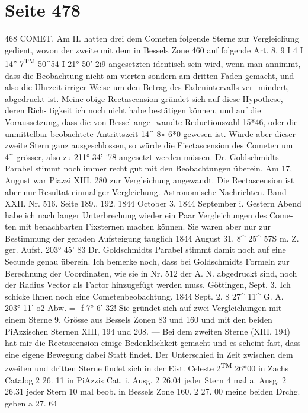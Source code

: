 \documentclass[10pt,a4paper]{article}
\begin{document}
\newpage
\section*{Seite 478}

468  COMET.
Am  II.  hatten   drei  dem  Cometen  folgende  Sterne   zur  Vergleicliung  gedient,  wovon  der   zweite
mit  dem  in  Bessels  Zone  460  auf  folgende  Art.
8.  9     I     4     I     14''  7\textsuperscript{TM}  50\textasciicircum{}54     I     21°  50'  2i\glqq{}9
angesetzten  identisch  sein  wird,  wenn  man  annimmt,  dass  die  Beobachtung  nicht  am  vierten  sondern
am  dritten  Faden  gemacht,  und  also  die  Uhrzeit  irriger  Weise  um  den  Betrag  des  Fadenintervalls  ver-
mindert, abgedruckt  ist.  Meine  obige  Rectascension  gründet  sich  auf  diese  Hypothese,  deren  Rich-
tigkeit ich  noch  nicht  habe  bestätigen  können,  und  auf  die  Voraussetzung,  dass  die  von  Bessel  ange-
wandte Reductionszahl  15*46,  oder  die  unmittelbar  beobachtete  Antrittszeit  14\glqq{}\textasciicircum{}  8\glqq{}»  6*0  gewesen  ist.
Würde  aber  dieser  zweite  Stern  ganz  ausgeschlossen,  so  würde  die  Fiectascension  des  Cometen  um  4\glqq{}\textasciicircum{}
grösser,  also  zu  211°  34'  i7\glqq{}8  angesetzt  werden  müssen.  Dr.  Goldschmidts  Parabel  stimmt  noch  immer
recht  gut  mit  den  Beobachtungen  überein.
Am    17,  August  war  Piazzi  XIII.  280  zur  Vergleichung  angewandt.      Die   Rectascension  ist   aber
nur  Resultat  einmaliger  Vergleichung.
Astronomische  Nachrichten.     Band  XXII.  Nr.  516.  Seite  189..  192.     1844  October  3.
1844  September  i.
Gestern  Abend  habe  ich  nach  langer  Unterbrechung   wieder  ein  Paar  Vergleichungen  des  Come-
ten mit  benachbarten  Fixsternen  machen  können.      Sie   waren  aber  nur  zur  Bestimmung   der  geraden
Aufsteigung  tauglich
1844  August  31.     8\glqq{}\textasciicircum{}  25\glqq{}\textasciicircum{}  57S  m.  Z.         ger.  Aufst.  203°  45'  8\glqq{}3
Dr.  Goldschmidts  Parabel  stimmt  damit  noch  auf  eine  Secunde  genau  überein.
Ich  bemerke  noch,   dass  bei  Goldschmidts  Formeln   zur  Berechnung  der  Coordinaten,   wie  sie  in
Nr.  512  der  A.  N.  abgedruckt  sind,  noch  der  Radius  Vector  als  Factor  hinzugefügt  werden  muss.
Göttingen,  Sept.  3.
Ich  schicke  Ihnen  noch  eine  Cometenbeobachtung.
1844  Sept.  2.     8\glqq{}  27\glqq{}\textasciicircum{}  11\textasciicircum{}         G.  A.  =  203°  11'  o\glqq{}2        Abw.  =  -f  7°  6'  32\glqq{}!
Sie  gründet  sich  auf  zwei  Vergleichungen  mit  einem  Sterne  9.  Grösse  aus  Bessels  Zonen  83  und  160
und  mit  den  beiden  PiAzzischen  Sternen  XIII,  194  und  208.  ---  Bei  dem  zweiten  Sterne  (XIII,  194)  hat
mir  die  Rectascension  einige  Bedenklichkeit  gemacht  und  es  scheint  fast,  dass  eine  eigene  Bewegung
dabei  Statt  findet.     Der  Unterschied  in  Zeit  zwischen  dem  zweiten  und  dritten  Sterne  findet  sich
in  der  Eist.  Celeste  2\textsuperscript{TM}  26*00
in  Zachs  Catalog  2     26. 11
in  PiAzzis  Cat.  i.  Ausg.  2     26.04  jeder  Stern  4  mal
a.  Ausg.  2     26.31  jeder  Stern  10  mal  beob.
in  Bessels  Zone  160.  2     27. 00
meine  beiden  Drchg.  geben  a    27.  64
\end{document}
